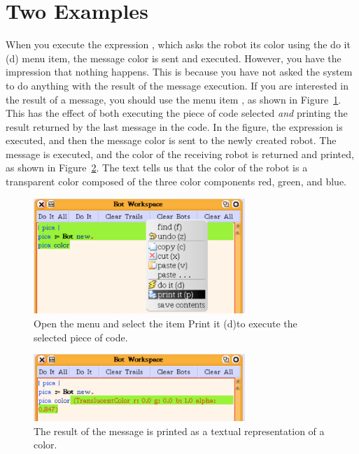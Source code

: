 \documentclass[a4paper,10pt,twoside]{book}
\begin{document}
\section{Two Examples}

When you execute the expression , which asks the robot its color using the do it (d) 
menu item, the message color is sent and executed. However, you have the impression that 
nothing happens. This is because you have not asked the system to do anything with the result 
of the message execution. If you are interested in the result of a message, you should use the 
menu item , as shown in Figure~\ref{fig:colorPrintIt}. This has the effect of both executing the piece 
of code selected \emph{and} printing the result returned by the last message in the code. In the figure, 
the expression  is executed, and then the message color is sent to the newly created 
robot. The message  is executed, and the color of the receiving robot is returned and 
printed, as shown in Figure~\ref{fig:resultColorPrintIt}. The text  tells us that the color of the robot is a transparent color composed of the three color 
components red, green, and blue. 


\begin{figure}
\centerline{\includegraphics[width=8cm]{colorPrintIt}} 
\caption{Open the menu and select the item Print it (d)to execute the selected piece of code. \label{fig:colorPrintIt}}
\end{figure}



\begin{figure}
\centerline{\includegraphics[width=8cm]{resultColorPrintIt}} 
\caption{The result of the message is printed as a textual representation of a color. \label{fig:resultColorPrintIt}}
\end{figure}
\end{document}
